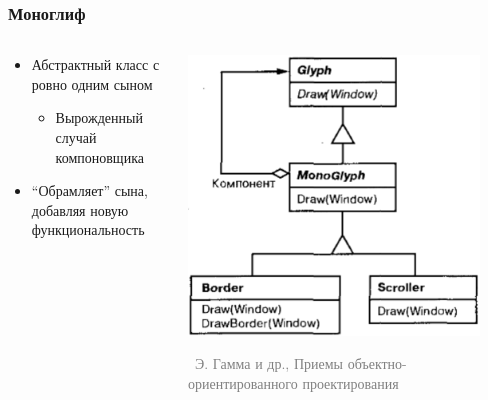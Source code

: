 \documentclass[xetex,mathserif,serif]{beamer}
\newcommand{\attribution}[1] {
    \vspace{-5mm}\begin{flushright}\begin{scriptsize}\textcolor{gray}{\textcopyright\, #1}\end{scriptsize}\end{flushright}
}
\begin{document}
    \begin{frame}
        \frametitle{Моноглиф}
        \begin{columns}
            \begin{column}{0.6\textwidth}
                \begin{itemize}
                    \item Абстрактный класс с ровно одним сыном
                    \begin{itemize}
                        \item Вырожденный случай компоновщика
                    \end{itemize}
                    \item ``Обрамляет'' сына, добавляя новую функциональность
                \end{itemize}
            \end{column}
            \begin{column}{0.4\textwidth}
                \begin{center}
                    \includegraphics[width=0.9\textwidth]{monoglyph.png}
                    \attribution{Э. Гамма и др., Приемы объектно-ориентированного проектирования}
                \end{center}
            \end{column}
        \end{columns}
    \end{frame}
\end{document}
